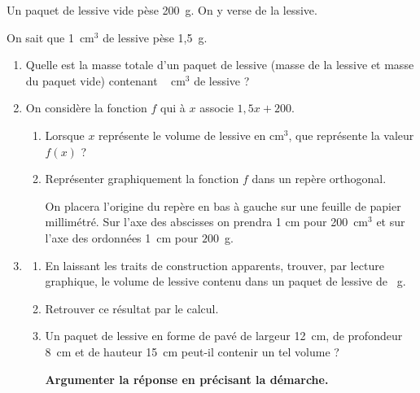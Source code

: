 \medskip

Un paquet de lessive vide pèse 200~g. On y verse de la lessive.

On sait que 1~cm$^3$ de lessive pèse 1,5~g.

\medskip

\begin{enumerate}
\item Quelle est la masse totale d'un paquet de lessive (masse de la lessive et masse du paquet vide) contenant ~ cm$^3$ de lessive ?
\item On considère la fonction $f$ qui à $x$ associe $1,5x + 200$.
	\begin{enumerate}
		\item Lorsque $x$ représente le volume de lessive en cm$^3$, que représente la valeur $f(x)$ ? 
		\item Représenter graphiquement la fonction $f$ dans un repère orthogonal.

On placera l'origine du repère en bas à gauche sur une feuille de papier millimétré. Sur l'axe des abscisses on prendra 1 cm pour 200~cm$^3$ et sur l'axe des ordonnées 1~cm pour $200$~g.
	\end{enumerate}
\item
	\begin{enumerate}
		\item En laissant les traits de construction apparents, trouver, par lecture graphique, le volume de lessive contenu dans un paquet de lessive de ~g.
		\item Retrouver ce résultat par le calcul.
		\item Un paquet de lessive en forme de pavé de largeur 12~cm, de profondeur 8~cm et de
hauteur 15~cm peut-il contenir un tel volume ? 

\textbf{Argumenter la réponse en précisant la démarche.}
	\end{enumerate}
\end{enumerate}

\medskip
